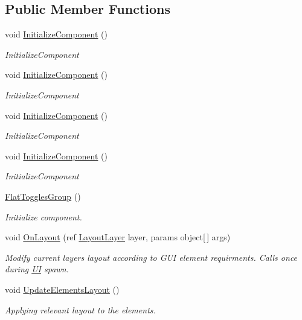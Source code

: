 \subsection*{Public Member Functions}
\begin{DoxyCompactItemize}
\item 
void \mbox{\hyperlink{class_wpf_handler_1_1_u_i_1_1_controls_1_1_flat_toggles_group_a6bf13c1fc4d0e238190ce92895b8123c}{Initialize\+Component}} ()
\begin{DoxyCompactList}\small\item\em Initialize\+Component \end{DoxyCompactList}\item 
void \mbox{\hyperlink{class_wpf_handler_1_1_u_i_1_1_controls_1_1_flat_toggles_group_a6bf13c1fc4d0e238190ce92895b8123c}{Initialize\+Component}} ()
\begin{DoxyCompactList}\small\item\em Initialize\+Component \end{DoxyCompactList}\item 
void \mbox{\hyperlink{class_wpf_handler_1_1_u_i_1_1_controls_1_1_flat_toggles_group_a6bf13c1fc4d0e238190ce92895b8123c}{Initialize\+Component}} ()
\begin{DoxyCompactList}\small\item\em Initialize\+Component \end{DoxyCompactList}\item 
void \mbox{\hyperlink{class_wpf_handler_1_1_u_i_1_1_controls_1_1_flat_toggles_group_a6bf13c1fc4d0e238190ce92895b8123c}{Initialize\+Component}} ()
\begin{DoxyCompactList}\small\item\em Initialize\+Component \end{DoxyCompactList}\item 
\mbox{\hyperlink{class_wpf_handler_1_1_u_i_1_1_controls_1_1_flat_toggles_group_a026f873b2f214e35ee3f3ad5715e1bad}{Flat\+Toggles\+Group}} ()
\begin{DoxyCompactList}\small\item\em Initialize component. \end{DoxyCompactList}\item 
void \mbox{\hyperlink{class_wpf_handler_1_1_u_i_1_1_controls_1_1_flat_toggles_group_a5619e5107d6cbc3fb2cdabb21deb40a4}{On\+Layout}} (ref \mbox{\hyperlink{class_wpf_handler_1_1_u_i_1_1_auto_layout_1_1_layout_layer}{Layout\+Layer}} layer, params object\mbox{[}$\,$\mbox{]} args)
\begin{DoxyCompactList}\small\item\em Modify current layer\textquotesingle{}s layout according to G\+UI element requirments. Calls once during \mbox{\hyperlink{namespace_wpf_handler_1_1_u_i}{UI}} spawn. \end{DoxyCompactList}\item 
void \mbox{\hyperlink{class_wpf_handler_1_1_u_i_1_1_controls_1_1_flat_toggles_group_a614b0a059caad9bc0704342bae1bb7f5}{Update\+Elements\+Layout}} ()
\begin{DoxyCompactList}\small\item\em Applying relevant layout to the elements. \end{DoxyCompactList}\end{DoxyCompactItemize}
